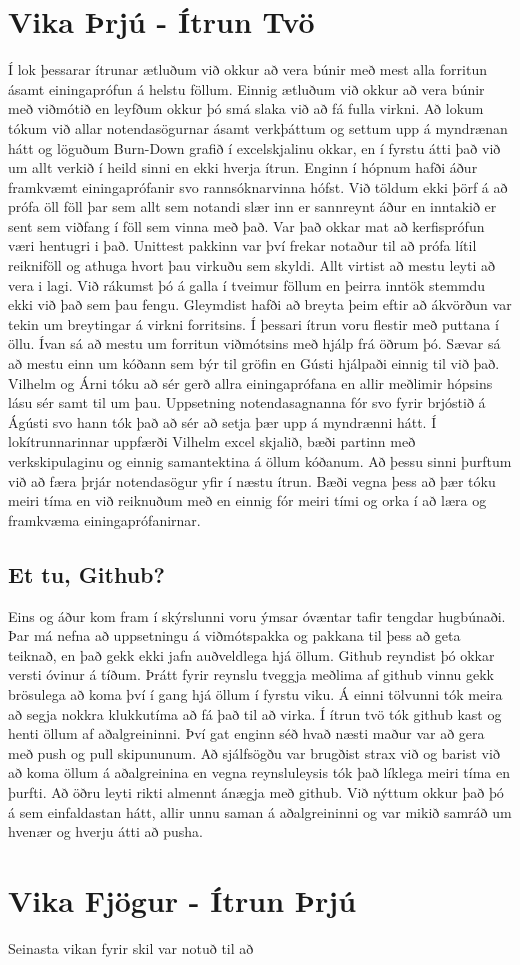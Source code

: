 \documentclass[a4paper, 12 pt]{article}
\begin{document}
\section{Vika Þrjú - Ítrun Tvö}
Í lok þessarar ítrunar ætluðum við okkur að vera búnir með mest alla forritun ásamt einingaprófun á helstu föllum.  Einnig ætluðum við okkur að vera búnir með viðmótið en leyfðum okkur þó smá slaka við að fá fulla virkni.  Að lokum tókum við allar notendasögurnar ásamt verkþáttum og settum upp á myndrænan hátt og löguðum Burn-Down grafið í excelskjalinu okkar, en í fyrstu átti það við um allt verkið í heild sinni en ekki hverja ítrun.   
Enginn í hópnum hafði áður framkvæmt einingaprófanir svo rannsóknarvinna hófst.  Við töldum ekki þörf á að prófa öll föll þar sem allt sem notandi slær inn er sannreynt áður en inntakið er sent sem viðfang í föll sem vinna með það.  Var það okkar mat að kerfisprófun væri hentugri i það.  Unittest pakkinn var því frekar notaður til að prófa lítil reikniföll og athuga hvort þau virkuðu sem skyldi.  Allt virtist að mestu leyti að vera i lagi.  Við rákumst þó á galla í tveimur föllum en þeirra inntök stemmdu ekki við það sem þau fengu.  Gleymdist hafði að breyta þeim eftir að ákvörðun var tekin um breytingar á virkni forritsins.  Í þessari ítrun voru flestir með puttana í öllu.  Ívan sá að mestu um forritun viðmótsins með hjálp frá öðrum þó.  Sævar sá að mestu einn um kóðann sem býr til gröfin en Gústi hjálpaði einnig til við það.  Vilhelm og Árni tóku að sér gerð allra einingaprófana en allir meðlimir hópsins lásu sér samt til um þau.  Uppsetning notendasagnanna fór svo fyrir brjóstið á Ágústi svo hann tók það að sér að setja þær upp á myndrænni hátt.  Í lokítrunnarinnar uppfærði Vilhelm excel skjalið, bæði partinn með verkskipulaginu og einnig samantektina á öllum kóðanum.  
Að þessu sinni þurftum við að færa þrjár notendasögur yfir í næstu ítrun.  Bæði vegna þess að þær tóku meiri tíma en við reiknuðum með en einnig fór meiri tími og orka í að læra og framkvæma einingaprófanirnar.

\subsection{Et tu, Github?}
Eins og áður kom fram í skýrslunni voru ýmsar óvæntar tafir tengdar hugbúnaði.  Þar má nefna að uppsetningu á viðmótspakka og pakkana til þess að geta teiknað, en það gekk ekki jafn auðveldlega hjá öllum.  Github reyndist þó okkar versti óvinur á tíðum.  Þrátt fyrir reynslu tveggja meðlima af github vinnu gekk brösulega að koma því í gang hjá öllum í fyrstu viku.  Á einni tölvunni tók meira að segja nokkra klukkutíma að fá það til að virka.  Í ítrun tvö tók github kast og henti öllum af aðalgreininni.  Því gat enginn séð hvað næsti maður var að gera með push og pull skipununum.  Að sjálfsögðu var brugðist strax við og barist við að koma öllum á aðalgreinina en vegna reynsluleysis tók það líklega meiri tíma en þurfti.  Að öðru leyti rikti almennt ánægja með github.  Við nýttum okkur það þó á sem einfaldastan hátt, allir unnu saman á aðalgreininni og var mikið samráð um hvenær og hverju átti að pusha.

\section{Vika Fjögur - Ítrun Þrjú}
Seinasta vikan fyrir skil var notuð til að 
\end{document}
